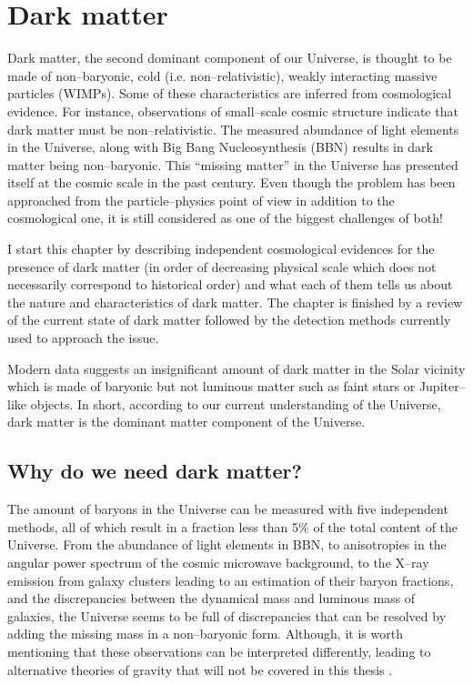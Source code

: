 \documentclass[a4wide,12pt]{book}
\begin{document}
\tableofcontents

\thispagestyle{empty}

\chapter{Dark matter}
Dark matter, the second dominant component of our Universe, is thought to be made of non--baryonic, cold (i.e. non--relativistic), weakly interacting massive particles (WIMPs). Some of these characteristics are inferred from cosmological evidence. For instance, observations of small--scale cosmic structure indicate that dark matter must be non--relativistic.  The measured abundance of light elements in the Universe, along with Big Bang Nucleosynthesis (BBN) results in dark matter being non--baryonic. This ``missing matter'' in the Universe has presented itself at the cosmic scale in the past century. Even though the problem has been approached from the particle--physics point of view in addition to the cosmological one, it is still considered as one of the biggest challenges of both!

I start this chapter by describing independent cosmological evidences for the presence of dark matter (in order of decreasing physical scale which does not necessarily correspond to historical order) and what each of them tells us about the nature and characteristics of dark matter. The chapter is finished by a review of the current state of dark matter followed by the detection methods currently used to approach the issue.

Modern data suggests an insignificant amount of dark matter in the Solar vicinity which is made of baryonic but not luminous matter such as faint stars or Jupiter--like objects. In short, according to our current understanding of the Universe, dark matter is the dominant matter component of the Universe.

\section{Why do we need dark matter?}
The amount of baryons in the Universe can be measured with five independent methods, all of which result in a fraction less than 5\% of the total content of the Universe. From the abundance of light elements in BBN, to anisotropies in the angular power spectrum of the cosmic microwave background, to the X--ray emission from galaxy clusters leading to an estimation of their baryon fractions, and the discrepancies between the dynamical mass and luminous mass of galaxies, the Universe seems to be full of discrepancies that can be resolved by adding the missing mass in a non--baryonic form. Although, it is worth mentioning that these observations can be interpreted differently, leading to alternative theories of gravity that will not be covered in this thesis \citep[but see e.g. ][]{Clifton2006, Clifton+2012, Bloomfield2013}.
\end{document}
